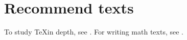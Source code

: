 \documentclass{article}
\begin{document}
\section*{Recommend texts}

To study \TeX in depth, see \cite{DK86}. For writing math texts, see \cite{DK89}.

\end{document}
